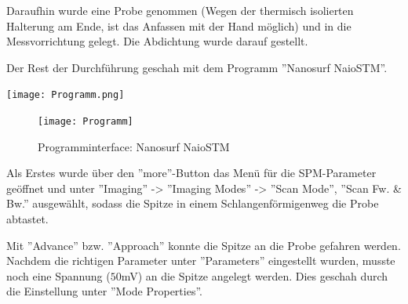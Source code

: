 \noindent Daraufhin wurde eine Probe genommen (Wegen der thermisch isolierten Halterung am Ende, ist das Anfassen mit der Hand möglich) und in die Messvorrichtung gelegt. Die Abdichtung wurde darauf gestellt.

\noindent Der Rest der Durchführung geschah mit dem Programm ''Nanosurf NaioSTM''.

\texttt{[image: Programm.png]}
\begin{figure}
	\centering
		\texttt{[image: Programm]}
	\caption{Programminterface: Nanosurf NaioSTM}
	\label{fig:Programm}
\end{figure}

\noindent Als Erstes wurde über den ''more''-Button das Menü für die SPM-Parameter geöffnet und unter ''Imaging'' -> ''Imaging Modes'' -> ''Scan Mode'', ''Scan Fw. \& Bw.'' ausgewählt, sodass die Spitze in einem Schlangenförmigenweg die Probe abtastet.

\noindent Mit ''Advance'' bzw. ''Approach'' konnte die Spitze an die Probe gefahren werden. Nachdem die richtigen Parameter unter ''Parameters'' eingestellt wurden, musste noch eine Spannung (\(50\)mV) an die Spitze angelegt werden. Dies geschah durch die Einstellung unter ''Mode Properties''.
